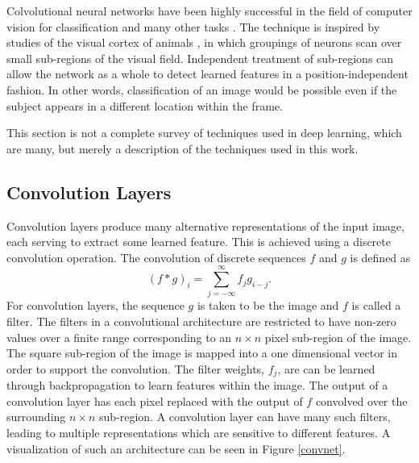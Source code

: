 Colvolutional neural networks have been highly successful in the field of
computer vision for classification and many other tasks
\cite{lecun2010convolutional,krizhevsky2012imagenet, ILSVRC15}.
The technique is inspired by studies of the visual cortex of animals
\cite{lecun2015deep}, in which groupings of neurons scan over small sub-regions
of the visual field.
Independent treatment of sub-regions can allow the network as a whole to detect
learned features in a position-independent fashion.
In other words, classification of an image would be possible even if the
subject appears in a different location within the frame.


This section is not a complete survey of techniques used in deep learning, which are many, but merely a description of the techniques used in this work.

\subsection{Convolution Layers}

Convolution layers \cite{lecun2015deep} produce many alternative representations
of the input image, each serving to extract some learned feature.
This is achieved using a  discrete convolution operation.  The convolution of discrete sequences $f$ and $g$ is defined as
\begin{equation}
(f*g)_i = \sum_{j = -\infty}^{\infty} f_j g_{i-j}.
\end{equation}
For convolution layers, the sequence $g$ is taken to be the image and $f$ is
called a filter.
The filters in a convolutional architecture are restricted to have non-zero values over a finite range corresponding to an $n \times n$ pixel sub-region of the image.
The square sub-region of the image is mapped into a one dimensional vector in order to support the convolution.  The filter weights, $f_j$, are can be learned through backpropagation to learn features within the image.  The output of a convolution layer has each pixel replaced with the output of $f$ convolved over the surrounding $n\times n$ sub-region.  A convolution layer can have many such filters, leading to multiple representations which are sensitive to different features.  A visualization of such an architecture can be seen in Figure \ref{convnet}.

